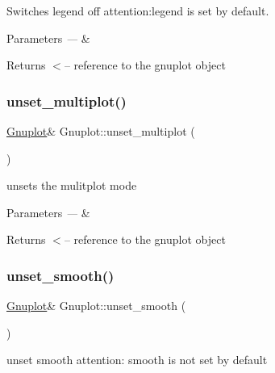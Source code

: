 Switches legend off attention\+:legend is set by default. 


\begin{DoxyParams}{Parameters}
{\em ---} & \\
\hline
\end{DoxyParams}
\begin{DoxyReturn}{Returns}
$<$-- reference to the gnuplot object 
\end{DoxyReturn}
\mbox{\label{class_gnuplot_aad76cdec16cfb5fdf82f45ed2786f4d8}} 
\subsubsection{\texorpdfstring{unset\+\_\+multiplot()}{unset\_multiplot()}}
{\footnotesize\ttfamily \mbox{\hyperlink{class_gnuplot}{Gnuplot}}\& Gnuplot\+::unset\+\_\+multiplot (\begin{DoxyParamCaption}{ }\end{DoxyParamCaption})\hspace{0.3cm}{\ttfamily [inline]}}

unsets the mulitplot mode


\begin{DoxyParams}{Parameters}
{\em ---} & \\
\hline
\end{DoxyParams}
\begin{DoxyReturn}{Returns}
$<$-- reference to the gnuplot object 
\end{DoxyReturn}
\mbox{\label{class_gnuplot_ad9dfbccd66dece1dbe5803605c6ab08c}} 
\subsubsection{\texorpdfstring{unset\+\_\+smooth()}{unset\_smooth()}}
{\footnotesize\ttfamily \mbox{\hyperlink{class_gnuplot}{Gnuplot}}\& Gnuplot\+::unset\+\_\+smooth (\begin{DoxyParamCaption}{ }\end{DoxyParamCaption})\hspace{0.3cm}{\ttfamily [inline]}}



unset smooth attention\+: smooth is not set by default 


